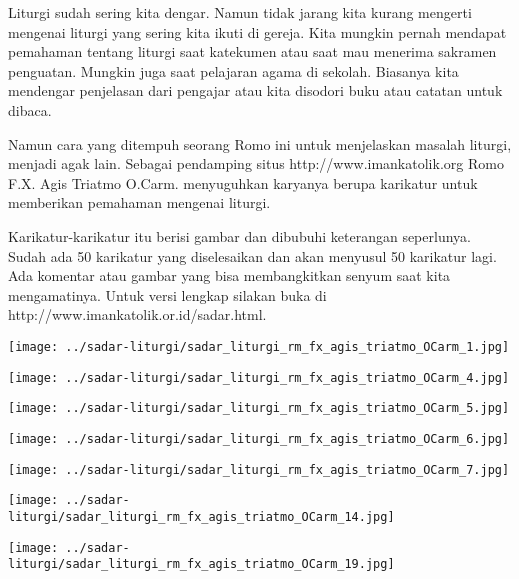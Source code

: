 
Liturgi sudah sering kita dengar. Namun tidak jarang kita kurang mengerti mengenai liturgi yang sering kita ikuti di gereja. Kita mungkin pernah mendapat pemahaman tentang liturgi saat katekumen atau saat mau menerima sakramen penguatan. Mungkin juga saat pelajaran agama di sekolah. Biasanya kita mendengar penjelasan dari pengajar atau kita disodori buku atau catatan untuk dibaca. 

Namun cara yang ditempuh seorang Romo ini untuk menjelaskan masalah liturgi, menjadi agak lain. Sebagai pendamping situs http://www.imankatolik.org Romo F.X. Agis Triatmo O.Carm. menyuguhkan karyanya berupa karikatur untuk memberikan pemahaman mengenai liturgi.

Karikatur-karikatur itu berisi gambar dan dibubuhi keterangan seperlunya. Sudah ada 50 karikatur yang diselesaikan dan akan menyusul 50 karikatur lagi. Ada komentar atau gambar yang bisa membangkitkan senyum saat kita mengamatinya. Untuk versi lengkap silakan buka di http://www.imankatolik.or.id/sadar.html.

\begin{center}
\texttt{[image: ../sadar-liturgi/sadar\_liturgi\_rm\_fx\_agis\_triatmo\_OCarm\_1.jpg]}


\texttt{[image: ../sadar-liturgi/sadar\_liturgi\_rm\_fx\_agis\_triatmo\_OCarm\_4.jpg]}

\texttt{[image: ../sadar-liturgi/sadar\_liturgi\_rm\_fx\_agis\_triatmo\_OCarm\_5.jpg]}


\texttt{[image: ../sadar-liturgi/sadar\_liturgi\_rm\_fx\_agis\_triatmo\_OCarm\_6.jpg]}

\texttt{[image: ../sadar-liturgi/sadar\_liturgi\_rm\_fx\_agis\_triatmo\_OCarm\_7.jpg]}

\texttt{[image: ../sadar-liturgi/sadar\_liturgi\_rm\_fx\_agis\_triatmo\_OCarm\_14.jpg]}

\vspace{2cm}

\texttt{[image: ../sadar-liturgi/sadar\_liturgi\_rm\_fx\_agis\_triatmo\_OCarm\_19.jpg]}

\end{center}

